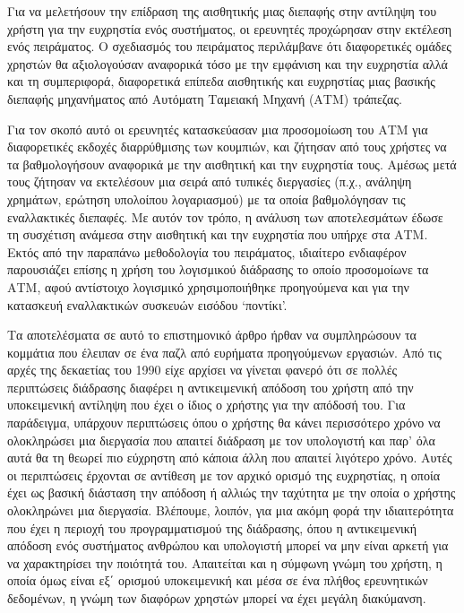 \documentclass[
]{article}
\begin{document}
Για να μελετήσουν την επίδραση της αισθητικής μιας διεπαφής στην
αντίληψη του χρήστη για την ευχρηστία ενός συστήματος, οι ερευνητές
προχώρησαν στην εκτέλεση ενός πειράματος. Ο σχεδιασμός του πειράματος
περιλάμβανε ότι διαφορετικές ομάδες χρηστών θα αξιολογούσαν αναφορικά
τόσο με την εμφάνιση και την ευχρηστία αλλά και τη συμπεριφορά,
διαφορετικά επίπεδα αισθητικής και ευχρηστίας μιας βασικής διεπαφής
μηχανήματος από Αυτόματη Ταμειακή Μηχανή (ΑΤΜ) τράπεζας.

Για τον σκοπό αυτό οι ερευνητές κατασκεύασαν μια προσομοίωση του ΑΤΜ για
διαφορετικές εκδοχές διαρρύθμισης των κουμπιών, και ζήτησαν από τους
χρήστες να τα βαθμολογήσουν αναφορικά με την αισθητική και την ευχρηστία
τους. Αμέσως μετά τους ζήτησαν να εκτελέσουν μια σειρά από τυπικές
διεργασίες (π.χ., ανάληψη χρημάτων, ερώτηση υπολοίπου λογαριασμού) με τα
οποία βαθμολόγησαν τις εναλλακτικές διεπαφές. Με αυτόν τον τρόπο, η
ανάλυση των αποτελεσμάτων έδωσε τη συσχέτιση ανάμεσα στην αισθητική και
την ευχρηστία που υπήρχε στα ΑΤΜ. Εκτός από την παραπάνω μεθοδολογία του
πειράματος, ιδιαίτερο ενδιαφέρον παρουσιάζει επίσης η χρήση του
λογισμικού διάδρασης το οποίο προσομοίωνε τα ΑΤΜ, αφού αντίστοιχο
λογισμικό χρησιμοποιήθηκε προηγούμενα και για την κατασκευή εναλλακτικών
συσκευών εισόδου `ποντίκι'.

Τα αποτελέσματα σε αυτό το επιστημονικό άρθρο ήρθαν να συμπληρώσουν τα
κομμάτια που έλειπαν σε ένα παζλ από ευρήματα προηγούμενων εργασιών. Από
τις αρχές της δεκαετίας του 1990 είχε αρχίσει να γίνεται φανερό ότι σε
πολλές περιπτώσεις διάδρασης διαφέρει η αντικειμενική απόδοση του χρήστη
από την υποκειμενική αντίληψη που έχει ο ίδιος ο χρήστης για την απόδοσή
του. Για παράδειγμα, υπάρχουν περιπτώσεις όπου ο χρήστης θα κάνει
περισσότερο χρόνο να ολοκληρώσει μια διεργασία που απαιτεί διάδραση με
τον υπολογιστή και παρ' όλα αυτά θα τη θεωρεί πιο εύχρηστη από κάποια
άλλη που απαιτεί λιγότερο χρόνο. Αυτές οι περιπτώσεις έρχονται σε
αντίθεση με τον αρχικό ορισμό της ευχρηστίας, η οποία έχει ως βασική
διάσταση την απόδοση ή αλλιώς την ταχύτητα με την οποία ο χρήστης
ολοκληρώνει μια διεργασία. Βλέπουμε, λοιπόν, για μια ακόμη φορά την
ιδιαιτερότητα που έχει η περιοχή του προγραμματισμού της διάδρασης, όπου
η αντικειμενική απόδοση ενός συστήματος ανθρώπου και υπολογιστή μπορεί
να μην είναι αρκετή για να χαρακτηρίσει την ποιότητά του. Απαιτείται και
η σύμφωνη γνώμη του χρήστη, η οποία όμως είναι εξ΄ ορισμού υποκειμενική
και μέσα σε ένα πλήθος ερευνητικών δεδομένων, η γνώμη των διαφόρων
χρηστών μπορεί να έχει μεγάλη διακύμανση.
\end{document}

